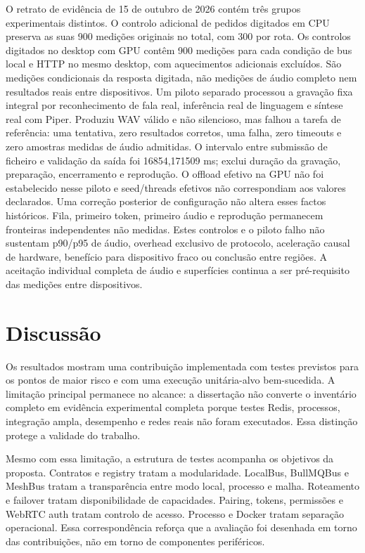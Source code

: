 O retrato de evidência de 15 de outubro de 2026 contém três grupos experimentais distintos. O controlo adicional de pedidos digitados em CPU preserva as suas 900 medições originais no total, com 300 por rota. Os controlos digitados no desktop com GPU contêm 900 medições para cada condição de bus local e HTTP no mesmo desktop, com aquecimentos adicionais excluídos. São medições condicionais da resposta digitada, não medições de áudio completo nem resultados reais entre dispositivos. Um piloto separado processou a gravação fixa integral por reconhecimento de fala real, inferência real de linguagem e síntese real com Piper. Produziu WAV válido e não silencioso, mas falhou a tarefa de referência: uma tentativa, zero resultados corretos, uma falha, zero timeouts e zero amostras medidas de áudio admitidas. O intervalo entre submissão de ficheiro e validação da saída foi 16854,171509 ms; exclui duração da gravação, preparação, encerramento e reprodução. O offload efetivo na GPU não foi estabelecido nesse piloto e seed/threads efetivos não correspondiam aos valores declarados. Uma correção posterior de configuração não altera esses factos históricos. Fila, primeiro token, primeiro áudio e reprodução permanecem fronteiras independentes não medidas. Estes controlos e o piloto falho não sustentam p90/p95 de áudio, overhead exclusivo de protocolo, aceleração causal de hardware, benefício para dispositivo fraco ou conclusão entre regiões. A aceitação individual completa de áudio e superfícies continua a ser pré-requisito das medições entre dispositivos.

\section{Discuss\~{a}o}
\label{sec:discussao}

Os resultados mostram uma contribui\c{c}\~{a}o implementada com testes previstos para os pontos de maior risco e com uma execu\c{c}\~{a}o unit\'{a}ria-alvo bem-sucedida. A limita\c{c}\~{a}o principal permanece no alcance: a disserta\c{c}\~{a}o n\~{a}o converte o invent\'{a}rio completo em evid\^{e}ncia experimental completa porque testes Redis, processos, integra\c{c}\~{a}o ampla, desempenho e redes reais n\~{a}o foram executados. Essa distin\c{c}\~{a}o protege a validade do trabalho.

Mesmo com essa limita\c{c}\~{a}o, a estrutura de testes acompanha os objetivos da proposta. Contratos e registry tratam a modularidade. LocalBus, BullMQBus e MeshBus tratam a transpar\^{e}ncia entre modo local, processo e malha. Roteamento e failover tratam disponibilidade de capacidades. Pairing, tokens, permiss\~{o}es e WebRTC auth tratam controlo de acesso. Processo e Docker tratam separa\c{c}\~{a}o operacional. Essa correspond\^{e}ncia refor\c{c}a que a avalia\c{c}\~{a}o foi desenhada em torno das contribui\c{c}\~{o}es, n\~{a}o em torno de componentes perif\'{e}ricos.

